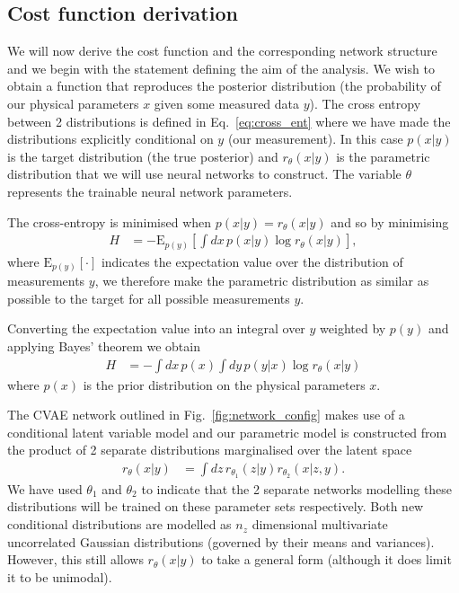\subsection{Cost function derivation}
%
%
We will now derive the cost function and the corresponding network structure
and we begin with the statement defining the aim of the analysis. We wish to
obtain a function that reproduces the posterior distribution (the probability
of our physical parameters $x$ given some measured data $y$). The cross entropy
between 2 distributions is defined in Eq.~\ref{eq:cross_ent} where we have made
the distributions explicitly conditional on $y$ (our measurement). In this case
$p(x|y)$ is the target distribution (the true posterior) and $r_{\theta}(x|y)$
is the parametric distribution that we will use neural networks to construct.
The variable $\theta$ represents the trainable neural network parameters. 

The cross-entropy is minimised when $p(x|y)=r_{\theta}(x|y)$ and so by
minimising
%
\begin{align}\label{eq:cost1}
H &= -\text{E}_{p(y)}\left[\int dx\,p(x|y) \log r_{\theta}(x|y)\right],
\end{align}
% 
where $\text{E}_{p(y)}[\cdot]$ indicates the expectation value over the
distribution of measurements $y$, we therefore make the parametric distribution
as similar as possible to the target for all possible measurements $y$.

Converting the expectation value into an integral over $y$ weighted by $p(y)$
and applying Bayes' theorem we obtain
%
\begin{align}\label{eq:cost1}
H &= -\int dx\,p(x)\int dy\,p(y|x)\log r_{\theta}(x|y)
\end{align}
%
where $p(x)$ is the prior distribution on the physical parameters $x$.

The \ac{CVAE} network outlined in Fig.~\ref{fig:network_config} makes use of a
conditional latent variable model and our parametric model is constructed from
the product of 2 separate distributions marginalised over the latent space
%
\begin{align}\label{eq:latent_model}
r_{\theta}(x|y) &= \int dz\,r_{\theta_{1}}(z|y)r_{\theta_{2}}(x|z,y).
\end{align}
%  
We have used $\theta_{1}$ and $\theta_{2}$ to indicate that the 2 separate
networks modelling these distributions will be trained on these parameter sets
respectively. Both new conditional distributions are modelled as $n_{z}$
dimensional multivariate uncorrelated Gaussian distributions (governed by their
means and variances). However, this still allows $r_{\theta}(x|y)$ to take a
general form (although it does limit it to be unimodal).  

